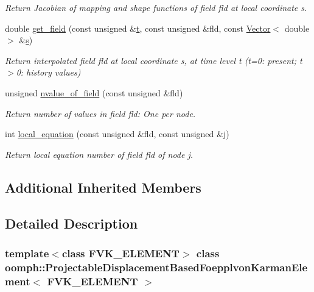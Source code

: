 \begin{DoxyCompactItemize}
\begin{DoxyCompactList}\small\item\em Return Jacobian of mapping and shape functions of field fld at local coordinate s. \end{DoxyCompactList}\item 
double \hyperlink{classoomph_1_1ProjectableDisplacementBasedFoepplvonKarmanElement_a942127e4616e7affc908c28c2561ce5a}{get\+\_\+field} (const unsigned \&\hyperlink{cfortran_8h_af6f0bd3dc13317f895c91323c25c2b8f}{t}, const unsigned \&fld, const \hyperlink{classoomph_1_1Vector}{Vector}$<$ double $>$ \&\hyperlink{cfortran_8h_ab7123126e4885ef647dd9c6e3807a21c}{s})
\begin{DoxyCompactList}\small\item\em Return interpolated field fld at local coordinate s, at time level t (t=0\+: present; t$>$0\+: history values) \end{DoxyCompactList}\item 
unsigned \hyperlink{classoomph_1_1ProjectableDisplacementBasedFoepplvonKarmanElement_aced5f16f95773d3dda606f3f21fc366e}{nvalue\+\_\+of\+\_\+field} (const unsigned \&fld)
\begin{DoxyCompactList}\small\item\em Return number of values in field fld\+: One per node. \end{DoxyCompactList}\item 
int \hyperlink{classoomph_1_1ProjectableDisplacementBasedFoepplvonKarmanElement_a165f26b2d0561d8d6e0d8a90f1e6c45d}{local\+\_\+equation} (const unsigned \&fld, const unsigned \&j)
\begin{DoxyCompactList}\small\item\em Return local equation number of field fld of node j. \end{DoxyCompactList}\end{DoxyCompactItemize}
\subsection*{Additional Inherited Members}


\subsection{Detailed Description}
\subsubsection*{template$<$class F\+V\+K\+\_\+\+E\+L\+E\+M\+E\+NT$>$\newline
class oomph\+::\+Projectable\+Displacement\+Based\+Foepplvon\+Karman\+Element$<$ F\+V\+K\+\_\+\+E\+L\+E\+M\+E\+N\+T $>$}

